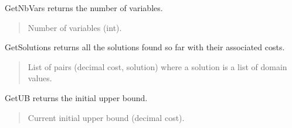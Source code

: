 \documentclass[letterpaper,10pt,openany,oneside,english]{sphinxmanual}
\begin{document}
\begin{fulllineitems}
\begin{fulllineitems}
\begin{quote}
\begin{description}
\end{description}\end{quote}

\end{fulllineitems}


\begin{fulllineitems}
\label{\detokenize{ref/ref_python:pytoulbar2.CFN.GetNbVars}}
\pysigstartsignatures
{}
\pysigstopsignatures
\sphinxAtStartPar
GetNbVars returns the number of variables.
\begin{quote}\begin{description}
\sphinxAtStartPar
Number of variables (int).

\end{description}\end{quote}

\end{fulllineitems}


\begin{fulllineitems}
\label{\detokenize{ref/ref_python:pytoulbar2.CFN.GetSolutions}}
\pysigstartsignatures
{}
\pysigstopsignatures
\sphinxAtStartPar
GetSolutions returns all the solutions found so far with their associated costs.
\begin{quote}\begin{description}
\sphinxAtStartPar
List of pairs (decimal cost, solution) where a solution is a list of domain values.

\end{description}\end{quote}

\end{fulllineitems}


\begin{fulllineitems}
\label{\detokenize{ref/ref_python:pytoulbar2.CFN.GetUB}}
\pysigstartsignatures
{}
\pysigstopsignatures
\sphinxAtStartPar
GetUB returns the initial upper bound.
\begin{quote}\begin{description}
\sphinxAtStartPar
Current initial upper bound (decimal cost).


\end{description}
\end{quote}
\end{fulllineitems}
\end{fulllineitems}
\end{document}
